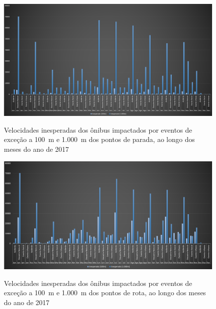 \documentclass[
	12pt,				%
	oneside,			%
	a4paper,			%
	english,			%
	brazil				%
	]{abntex2ppgsi}
\begin{document}
{{{\begin{figure}[!htb]
	\centering
 	  \caption{Velocidades inesperadas dos ônibus impactados por eventos de exceção a 100~m e 1.000~m dos pontos de parada, ao longo dos meses do ano de 2017}
		\includegraphics[width=1\linewidth]{images/apriori_analysis_stops.png}
	\label{fig:apriori_analysis_stops}
\end{figure}

\begin{figure}[!htb]
	\centering
 	  \caption{Velocidades inesperadas dos ônibus impactados por eventos de exceção a 100~m e 1.000~m dos pontos de rota, ao longo dos meses do ano de 2017}
		\includegraphics[width=1\linewidth]{images/apriori_analysis_shapes.png}
	\label{fig:apriori_analysis_shapes}
\end{figure}

}}}
\end{document}
